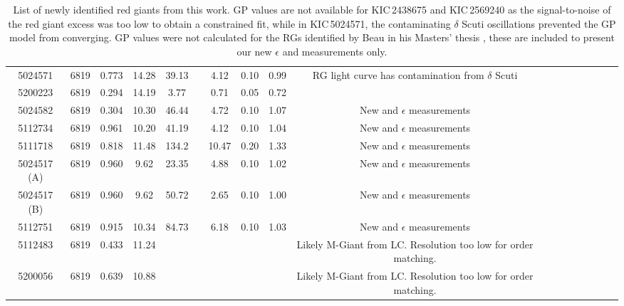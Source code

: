 \begin{table}
{\begin{tabular}{cccccccccccccccccl}
            5024571	&	6819	&	0.773	&	14.28		&	39.13		&         \textemdash       &	4.12	&		0.10	    &	0.99	&	RG light curve has contamination from $\delta$ Scuti\\
            5200223	&	6819	&	0.294	&	14.19		&	3.77		&						    &	0.71	&		0.05		&	0.72	&	\\
            \midrule
            5024582	&	6819	&	0.304	&	10.30		&	46.44		&         \textemdash       &	4.72	&		0.10		&	1.07	&	New \dnu{} and $\epsilon$ measurements\\
            5112734	&	6819	&	0.961	&	10.20		&	41.19		&         \textemdash       &	4.12	&		0.10		&	1.04	&	New \dnu{} and $\epsilon$ measurements\\
            5111718	&	6819	&	0.818	&	11.48		&	134.2		&         \textemdash       &	10.47	&		0.20		&	1.33	&	New \dnu{} and $\epsilon$ measurements\\
        5024517 (A)	&	6819	&	0.960	&	9.62		&	23.35		&         \textemdash       &	4.88	&		0.10		&	1.02	&	New \dnu{} and $\epsilon$ measurements\\
        5024517 (B)	&	6819	&	0.960	&	9.62		&	50.72		&         \textemdash       &	2.65	&		0.10		&	1.00	&	New \dnu{} and $\epsilon$ measurements\\
            5112751	&	6819	&	0.915	&	10.34		&	84.73		&         \textemdash       &	6.18	&		0.10		&	1.03	&	New \dnu{} and $\epsilon$ measurements\\
            \midrule
            5112483	&	6819	&	0.433	&	11.24		&\textemdash	&         \textemdash       &\textemdash&   \textemdash	&\textemdash	&	Likely M-Giant from LC. Resolution too low for order matching.\\
            5200056	&	6819	&	0.639	&	10.88		&\textemdash	&         \textemdash       &\textemdash&   \textemdash	&\textemdash	&	Likely M-Giant from LC. Resolution too low for order matching.\\

            \bottomrule
        \end{tabular}
    }
    \caption{List of newly identified red giants from this work. GP \numax{} values are not available for KIC\,2438675 and KIC\,2569240 as the signal-to-noise of the red giant excess was too low to obtain a constrained fit, while in KIC\,5024571, the contaminating $\delta$ Scuti oscillations prevented the GP model from converging. GP \numax{} values were not calculated for the RGs identified by Beau in his Masters' thesis \citep{bellamy_using_2015}, these are included to present our new $\epsilon$ and \dnu{} measurements only.}
    \label{tab:6791rgc}
\end{table}

